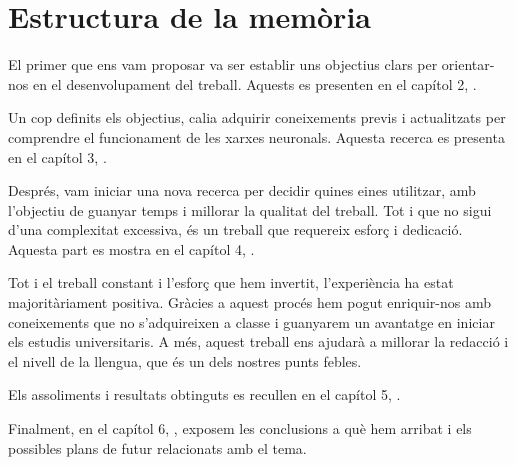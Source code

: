 \section{Estructura de la memòria}
El primer que ens vam proposar va ser establir uns objectius clars per orientar-nos en el desenvolupament del treball. Aquests es presenten en el capítol 2, .

Un cop definits els objectius, calia adquirir coneixements previs i actualitzats per comprendre el funcionament de les xarxes neuronals. Aquesta recerca es presenta en el capítol 3, .

Després, vam iniciar una nova recerca per decidir quines eines utilitzar, amb l’objectiu de guanyar temps i millorar la qualitat del treball. Tot i que no sigui d’una complexitat excessiva, és un treball que requereix esforç i dedicació. Aquesta part es mostra en el capítol 4, .

Tot i el treball constant i l’esforç que hem invertit, l’experiència ha estat majoritàriament positiva. Gràcies a aquest procés hem pogut enriquir-nos amb coneixements que no s’adquireixen a classe i guanyarem un avantatge en iniciar els estudis universitaris. A més, aquest treball ens ajudarà a millorar la redacció i el nivell de la llengua, que és un dels nostres punts febles.

Els assoliments i resultats obtinguts es recullen en el capítol 5, .

Finalment, en el capítol 6, , exposem les conclusions a què hem arribat i els possibles plans de futur relacionats amb el tema.



